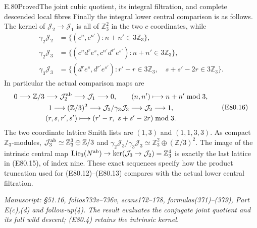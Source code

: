 \begin{statement}{E.80}{Proved}{The joint cubic quotient, its integral filtration, and complete descended local fibres}
Finally the integral lower central comparison is
as follows. The kernel of
$\mathcal J_2\to\mathcal J_1$ is all of
$\mathbb Z_3^2$ in the two $c$ coordinates, while
\[
 \begin{aligned}
 \gamma_2\mathcal J_2
   &=\{(c^n,c^{n'}):n+n'\in3\mathbb Z_3\},\\
 \gamma_2\mathcal J_3
   &=\{(c^nd^re^s,c^{n'}d^{r'}e^{s'}):
                            n+n'\in3\mathbb Z_3\},\\
 \gamma_3\mathcal J_3
   &=\{(d^re^s,d^{r'}e^{s'}):
          r'-r\in3\mathbb Z_3,\quad
          s+s'-2r\in3\mathbb Z_3\}.
 \end{aligned}
 \tag{E80.15}
\]
In particular the actual comparison maps are
\[
 \begin{gathered}
 0\longrightarrow\mathbb Z/3
   \longrightarrow\mathcal J_2^{\rm ab}
   \longrightarrow\mathcal J_1\longrightarrow0,
       \qquad (n,n')\longmapsto n+n'\bmod3,\\
 1\longrightarrow(\mathbb Z/3)^2
   \longrightarrow\mathcal J_3/\gamma_3\mathcal J_3
   \longrightarrow\mathcal J_2\longrightarrow1,\\
 (r,s,r',s')\longmapsto
           (r'-r,\ s+s'-2r)\bmod3.
 \end{gathered}
 \tag{E80.16}
\]
The two coordinate lattice Smith lists are $(1,3)$
and $(1,1,3,3)$. As compact $\mathbb Z_3$-modules,
$\mathcal J_3^{\rm ab}\simeq\mathbb Z_3^3\oplus\mathbb Z/3$
and
$\gamma_2\mathcal J_3/\gamma_3\mathcal J_3
 \simeq\mathbb Z_3^2\oplus(\mathbb Z/3)^2$.
The image of the intrinsic central map
$\operatorname{Lie}_3(N^{\rm ab})\to
 \ker(\mathcal J_3\to\mathcal J_2)=\mathbb Z_3^4$
is exactly the last lattice in (E80.15), of index
nine. These exact sequences specify how the product
truncation used for (E80.12)--(E80.13) compares with
the actual lower central filtration.

\emph{Manuscript: \S51.16, folios733v--736v,
scans172--178, formulas(371)--(379), Part E(c),(d)
and follow-up(4). The result evaluates the conjugate
joint quotient and its full wild descent; (E80.4)
retains the intrinsic kernel.}
\end{statement}


